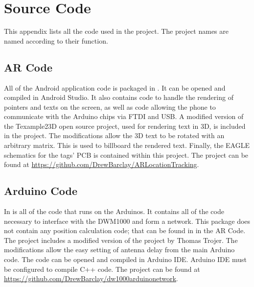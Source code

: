 
\chapter{Source Code} %
\label{SourceCode} %

This appendix lists all the code used in the project. The project names are named according to their function.

\section{AR Code}
All of the Android application code is packaged in . It can be opened and compiled in Android Studio. It also contains code to handle the rendering
of pointers and texts on the screen, as well as code allowing the phone to communicate
with the Arduino chips via FTDI and USB. A modified version of the Texample23D open source project, used for rendering text in 3D, is included in the project. The modifications allow the 3D text to be rotated with an arbitrary matrix. This is used to billboard the rendered text. Finally, the EAGLE schematics for the tags' PCB is contained within this project. The project can be found at \url{https://github.com/DrewBarclay/ARLocationTracking}.

\section{Arduino Code}
In  is all of the code that runs on the Arduinos. It contains all of the code necessary
to interface with the DWM1000 and form a network. This package does not contain any position calculation code; that can be found in  in the AR Code. The project includes a modified version of the  project by Thomas Trojer. The modifications allow the easy setting of antenna delay from the main Arduino code. The code can be opened and compiled in Arduino IDE. Arduino IDE must be configured to compile C++ code. The project can be found at \url{https://github.com/DrewBarclay/dw1000arduinonetwork}.

